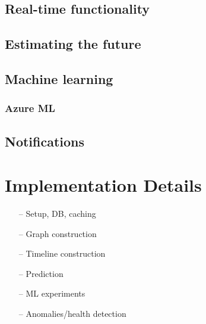 \documentclass[english,12pt,a4paper,pdftex,sci,utf8]{aaltothesis}
\begin{document}

\subsection{Real-time functionality}

\subsection{Estimating the future}

\subsection{Machine learning}



\subsubsection{Azure ML}

\subsection{Notifications}



\clearpage
\section{Implementation Details}

\begin{itemize}
\item[--]Setup, DB, caching
\item[--]Graph construction
\item[--]Timeline construction
\item[--]Prediction
\item[--]ML experiments
\item[--]Anomalies/health detection
\end{itemize}
\end{document}
